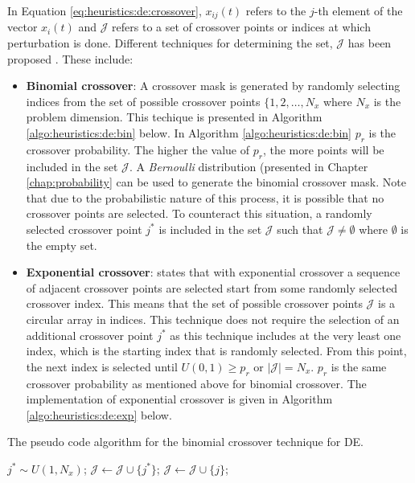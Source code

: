 In Equation \ref{eq:heuristics:de:crossover}, $x_{ij}(t)$ refers to the $j$-th element of the vector $x_{i}(t)$ and $\mathcal{J}$ refers to a set of crossover points or indices at which perturbation is done. Different techniques for determining the set, $\mathcal{J}$ has been proposed \cite{ref:storn:1996}\cite{ref:storn:1997}. These include:

\begin{itemize}
    \item \textbf{Binomial crossover}: A crossover mask is generated by randomly selecting indices from the set of possible crossover points $\{1,2,\dots,N_{x}$ where $N_{x}$ is the problem dimension. This techique is presented in Algorithm \ref{algo:heuristics:de:bin} below. In Algorithm \ref{algo:heuristics:de:bin} $p_{r}$ is the crossover probability. The higher the value of $p_{r}$, the more points will be included in the set $\mathcal{J}$. A \textit{Bernoulli} distribution (presented in Chapter \ref{chap:probability} can be used to generate the binomial crossover mask. Note that due to the probabilistic nature of this process, it is possible that no crossover points are selected. To counteract this situation, a randomly selected crossover point $j^{*}$ is included in the set $\mathcal{J}$ such that $\mathcal{J} \neq \emptyset$ where $\emptyset$ is the empty set.
    \item \textbf{Exponential crossover}: \citeauthor{ref:engelbrecht:2007}\cite{ref:engelbrecht:2007} states that with exponential crossover a sequence of adjacent crossover points are selected start from some randomly selected crossover index. This means that the set of possible crossover points $\mathcal{J}$ is a circular array in indices. This technique does not require the selection of an additional crossover point $j^{*}$ as this technique includes at the very least one index, which is the starting index that is randomly selected. From this point, the next index is selected until $U(0,1) \geq p_{r}$ or $|\mathcal{J}| = N_{x}$. $p_{r}$ is the same crossover probability as mentioned above for binomial crossover. The implementation of exponential crossover is given in Algorithm \ref{algo:heuristics:de:exp} below.
\end{itemize}

\begin{algorithm}[H]
    \caption{The pseudo code algorithm for the binomial crossover technique for \ac{DE}.}
    \label{algo:heuristics:de:bin}
    \begin{algorithmic}
        \State $j^{*} \sim U(1,N_{x})$;
        \State $\mathcal{J} \gets \mathcal{J} \cup \{j^{*}\}$;
                \State $\mathcal{J} \gets \mathcal{J} \cup \{j\}$;
            \EndIf
        \EndFor
    \end{algorithmic}
\end{algorithm}

